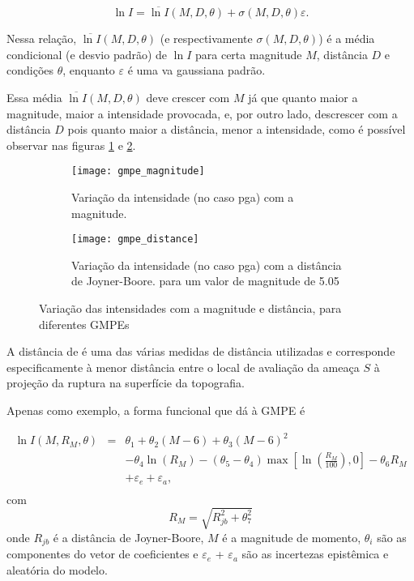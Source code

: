 \begin{equation} \label{pgamodel}
\ln I = \overline{\ln I}(M, D, \theta) + \sigma(M, D, \theta) \varepsilon.
\end{equation}

Nessa relação, $\overline{\ln I}(M, D, \theta)$ (e respectivamente $\sigma(M, D, \theta)$) 
é a média condicional (e desvio padrão) de $\ln I$ para certa magnitude $M$, distância $D$
e condições $\theta$, enquanto $\varepsilon$ é uma \gls{va} gaussiana padrão.

Essa média $\overline{\ln I}(M, D, \theta)$ deve crescer com $M$ já que quanto maior a magnitude,
maior a intensidade provocada, e, por outro lado, descrescer com a distância $D$ pois quanto maior a distância, menor
a intensidade, como é possível observar nas figuras \ref{fig:gmpe_magnitude} e \ref{fig:gmpe_distance}.

\begin{figure}[H]
	\centering
	\begin{subfigure}[t]{0.47\textwidth}
		\centering
		\texttt{[image: gmpe\_magnitude]} 
		\caption{Variação da intensidade (no caso \gls{pga}) com a magnitude.}
		\label{fig:gmpe_magnitude} 
	\end{subfigure}
	\quad
	\begin{subfigure}[t]{0.47\textwidth}
		\centering
		\texttt{[image: gmpe\_distance]} 
		\caption{Variação da intensidade (no caso \gls{pga}) com a distância de Joyner-Boore.
		  para um valor de magnitude de 5.05 }
		\label{fig:gmpe_distance} 
	\end{subfigure}
	\caption{Variação das intensidades com a magnitude e distância, para diferentes GMPEs}
	\label{fig:gmpe} 
\end{figure}

A distância de \citet{joyner_1981} é uma das várias medidas de distância utilizadas e corresponde especificamente à
menor distância entre o local de avaliação da ameaça $S$ à projeção da ruptura na superfície da topografia. 

Apenas como exemplo, a forma funcional que \citet{toro_1997} dá à GMPE é

\begin{equation}
\begin{array}{lcl}
\ln I(M, R_M, \theta) 
&=& \theta_1 + \theta_2(M-6) + \theta_3(M-6)^2  \\
& & - \theta_4\ln (R_M) -(\theta_5 - \theta_4)\max\left[ \ln\left( \frac{R_M}{100} \right), 0 \right] -\theta_6 R_M \\
& & + \varepsilon_e + \varepsilon_a, \\
\end{array}
\end{equation}
com 
$$
R_M =  \sqrt{ R_{jb}^2 + \theta_7^2 }
$$
onde $R_{jb}$ é a distância de Joyner-Boore, $M$ é a magnitude de momento,
$\theta_i$ são as componentes do vetor de coeficientes e $\varepsilon_e$ + $\varepsilon_a$
são as incertezas epistêmica e aleatória do modelo.

